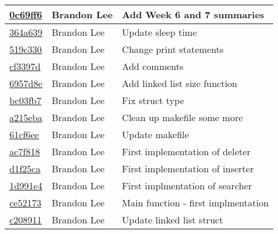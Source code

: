 \documentclass[letterpaper,10pt,titlepage]{article}
\begin{document}
\begin{tabular}{l l l}
\href{https://github.com/brandonlee503/Operating-Systems-II/commit/0c69ff67b6e5b4a4aabcae682f77d40bb382f7be}{0c69ff6} & Brandon Lee & Add Week 6 and 7 summaries\\\hline
\href{https://github.com/brandonlee503/Operating-Systems-II/commit/364a639020f9f8a745cb42dd565edc29db625c92}{364a639} & Brandon Lee & Update sleep time\\\hline
\href{https://github.com/brandonlee503/Operating-Systems-II/commit/519c330971eaf31bc32cbc543503dbb448558d20}{519c330} & Brandon Lee & Change print statements\\\hline
\href{https://github.com/brandonlee503/Operating-Systems-II/commit/cf3397d9b4dbfd76e4cd47568b99df71974537e4}{cf3397d} & Brandon Lee & Add comments\\\hline
\href{https://github.com/brandonlee503/Operating-Systems-II/commit/6957d8edeba7172d1020d1287a10dd3265df2578}{6957d8e} & Brandon Lee & Add linked list size function\\\hline
\href{https://github.com/brandonlee503/Operating-Systems-II/commit/bc03fb78725ed0ed4a8bc8b02fc00bd5eb0c2990}{bc03fb7} & Brandon Lee & Fix struct type\\\hline
\href{https://github.com/brandonlee503/Operating-Systems-II/commit/a215eba032f6fc75c62acc6a20a628ad2babbff5}{a215eba} & Brandon Lee & Clean up makefile some more\\\hline
\href{https://github.com/brandonlee503/Operating-Systems-II/commit/61cf6ee1bf911834e628d6f3d5dd743d0d7b1340}{61cf6ee} & Brandon Lee & Update makefile\\\hline
\href{https://github.com/brandonlee503/Operating-Systems-II/commit/ac7f8185769dd2d21a835d6183173e73660ff7fe}{ac7f818} & Brandon Lee & First implementation of deleter\\\hline
\href{https://github.com/brandonlee503/Operating-Systems-II/commit/d1f25cab376a6cb44f0bb4f1c6b0b3d917fc4e57}{d1f25ca} & Brandon Lee & First implementation of inserter\\\hline
\href{https://github.com/brandonlee503/Operating-Systems-II/commit/1d991e479d2e28ef279a91fff6f61228fe5aff44}{1d991e4} & Brandon Lee & First implmentation of searcher\\\hline
\href{https://github.com/brandonlee503/Operating-Systems-II/commit/ce52173ee0d65d97ece46268569a5ab749ea6de2}{ce52173} & Brandon Lee & Main function - first implmentation\\\hline
\href{https://github.com/brandonlee503/Operating-Systems-II/commit/c208911c08faab924923b23d8750be5987c71fc7}{c208911} & Brandon Lee & Update linked list struct\\\hline

\end{tabular}
\end{document}
